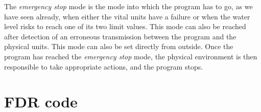 \documentclass{report}
\begin{document}
The \emph{emergency stop} mode is the mode into which the program has
to go, as we have seen already, when either the vital units have a
failure or when the water level risks to reach one of its two limit
values.  This mode can also be reached after detection of an
erroneous transmission between the program and the physical units.
This mode can also be set directly from outside.  Once the program has
reached the \emph{emergency stop} mode, the physical environment is
then responsible to take appropriate actions, and the program stops.



\chapter{FDR code}
\label{appendix:FDR-code}
\end{document}
